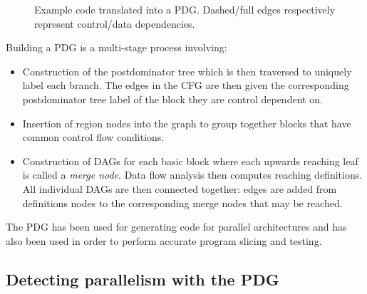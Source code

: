 \begin{figure}
\centering
{}
\caption{Example code translated into a PDG. Dashed/full edges respectively represent control/data dependencies.}
\label{fig:pdg}
\end{figure}

Building a PDG is a multi-stage process involving:

\begin{itemize}
\item Construction of the postdominator tree which is then traversed to uniquely label each branch. The edges in the CFG are then given the corresponding postdominator tree label of the block they are control dependent on.
\item Insertion of region nodes into the graph to group together blocks that have common control flow conditions.
\item Construction of DAGs for each basic block where each upwards reaching leaf is called a \textit{merge node}. Data flow analysis then computes reaching definitions. All individual DAGs are then connected together: edges are added from definitions nodes to the corresponding merge nodes that may be reached.
\end{itemize}

The PDG has been used for generating code for parallel architectures and has also been used in order to perform accurate program slicing and testing.

\subsection{Detecting parallelism with the PDG}

